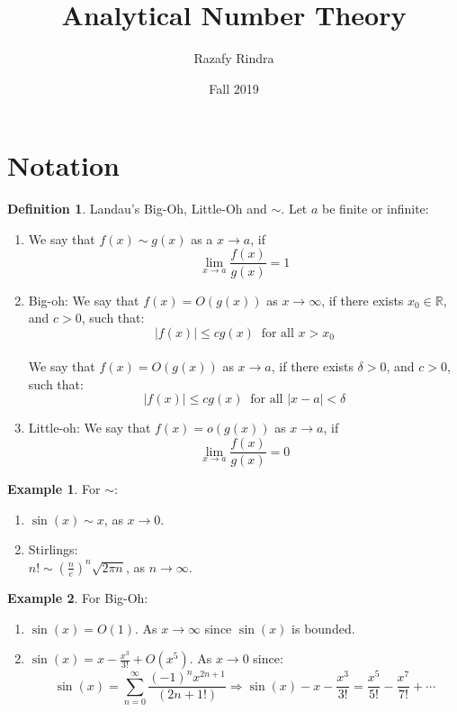 \documentclass{article}
\title{Analytical Number Theory}
\author{Razafy Rindra}
\date{Fall 2019}
\newcommand{\R}{\mathbb{R}}
\theoremstyle{definition}
\newtheorem{definition}{Definition}[section]
\theoremstyle{remark}
\theoremstyle{definition}
\newtheorem{example}{Example}[definition]
\begin{document}
	\maketitle
	\section{Notation}
		\begin{definition}
			Landau's Big-Oh, Little-Oh and $\sim$. Let $a$ be finite or infinite:
			\begin{enumerate}
				\item We say that $f(x)\sim g(x)$ as a $x\rightarrow a$, if\begin{equation*}
					\lim_{x\rightarrow a} \frac{f(x)}{g(x)} = 1
				\end{equation*}
				\item Big-oh: We say that $f(x) = O(g(x))$ as $x\rightarrow \infty$, if there exists $x_0\in \R$, and $c>0$, such that:\begin{equation*}
					|f(x)| \leq cg(x) \ \text{ for all } x>x_0
				\end{equation*}\\
				 We say that $f(x) = O(g(x))$ as $x\rightarrow a$, if there exists $\delta>0$, and $c>0$, such that:\begin{equation*}
				|f(x)| \leq cg(x) \ \text{ for all } |x-a|<\delta
				\end{equation*}
				\item Little-oh: We say that $f(x) = o(g(x))$ as $x\rightarrow a$, if\begin{equation*}
				\lim_{x\rightarrow a} \frac{f(x)}{g(x)} = 0
				\end{equation*}
			\end{enumerate}
		\end{definition}
	\begin{example} For $\sim$:
			\begin{enumerate}
				\item $\sin(x)\sim x$, as $x\rightarrow 0$.
				\item Stirlings:\\
					$n! \sim (\frac{n}{e})^n\sqrt{2\pi n}$, as $n\rightarrow \infty$.
			\end{enumerate}
	\end{example}
	\begin{example} For Big-Oh:
		\begin{enumerate}
			\item $\sin(x) = O(1)$. As $x\rightarrow \infty$ since $\sin(x)$ is bounded.
			\item $\sin(x) = x - \frac{x^3}{3!} + O(x^5)$. As $x\rightarrow 0$ since: \begin{equation*}
				\sin(x) = \sum_{n=0}^{\infty} \frac{(-1)^{n}x^{2n+1}}{(2n+1!)} \Rightarrow \sin(x) - x - \frac{x^3}{3!} = \frac{x^5}{5!} - \frac{x^7}{7!} +\cdots
			\end{equation*}
		\end{enumerate}
	\end{example}
\end{document}
